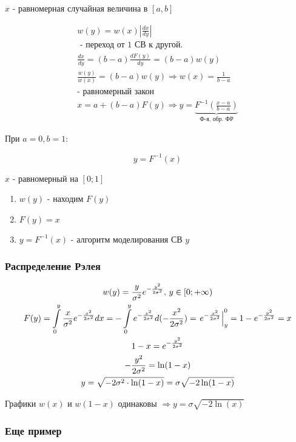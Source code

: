 \documentclass[14pt,a4paper,oneside]{extarticle}
\begin{document}
$x$ - равномерная случайная величина в $[a,b]$

\begin{gather*}
    w(y)=w(x)\left\lvert\frac{dx}{dy} \right\rvert \\\text{ - переход от 1 СВ к другой.}\\
    \frac{dx}{dy}=(b-a)\frac{dF(y)}{dy}=(b-a)w(y)\\
    \frac{w(y)}{w(x)}=(b-a)w(y)\Longrightarrow w(x) = \frac{1}{b-a} \\\text{- равномерный закон}\\
    x=a+(b-a)F(y)\Rightarrow y=\underbrace{F^{-1}\left(\frac{x-a}{b-a}\right) }_{\text{Ф-я, обр. ФР}}
\end{gather*}

При $a=0,b=1$:

\[y=F^{-1}(x)\]

$x$ - равномерный на $[0;1]$

\begin{enumerate}
    \item $w(y)$ - находим $F(y)$
    \item $F(y)=x$
    \item $y=F^{-1}(x)$ - алгоритм моделирования СВ $y$
\end{enumerate}

\subsubsection{Распределение Рэлея}

\begin{gather*}
    w(y)=\frac{y}{\sigma^2}e^{-\frac{y^2}{2\sigma^2}} \text{, }
    y\in[0;+\infty)\\
    F(y)=\int\displaylimits_{0}^{y}\frac{x}{\sigma^2}e^{-\frac{x^2}{2\sigma^2}}dx=-\int\displaylimits_{0}^{y}e^{-\frac{x^2}{2\sigma^2}}d(-\frac{x^2}{2\sigma^2})=\left. e^{-\frac{x^2}{2\sigma^2}}\right\vert_y^0=1-e^{-\frac{y^2}{2\sigma^2}}=x\\
    1-x=e^{-\frac{y^2}{2\sigma^2}}\\
    -\frac{y^2}{2\sigma^2}=\ln(1-x)\\
    y=\sqrt{-2\sigma^2\cdot\ln(1-x)}=\sigma\sqrt{-2\ln(1-x)}\\
\end{gather*}

Графики $w(x)$ и $w(1-x)$ одинаковы $\Longrightarrow y=\sigma\sqrt{-2\ln(x)}$

\subsubsection{Еще пример}
\end{document}
